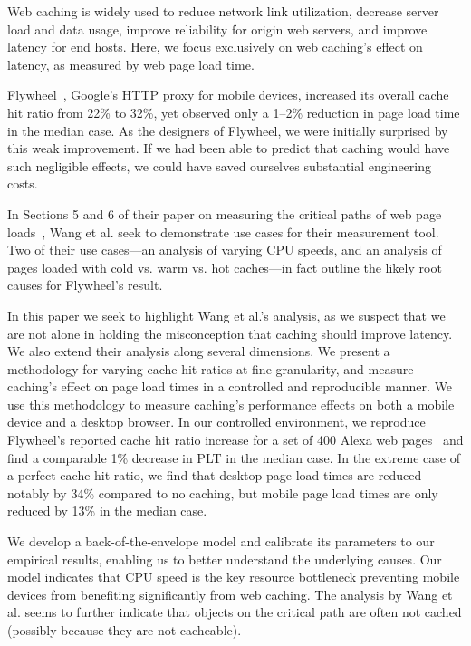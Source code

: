 \label{intro}
Web caching is widely used to reduce network link utilization, decrease server load and data usage, improve reliability for origin web servers, and improve latency for end hosts.
Here, we focus exclusively on web caching's effect on latency, as measured by web page load time.

Flywheel~\cite{flywheel}, Google's HTTP proxy for mobile devices, increased
its overall cache hit ratio from 22\% to 32\%, yet observed only a 1--2\% reduction in page load time in the median case.
As the designers of Flywheel, we were initially surprised by this weak
improvement. If we had been able to predict that caching would have such
negligible effects, we could have saved ourselves substantial engineering costs. %

In Sections 5 and 6 of their paper on measuring the critical paths of web page 
loads~\cite{wang2013demystifying}, Wang et al. seek to demonstrate use 
cases for their measurement tool. Two of their use cases---an analysis of
varying CPU speeds, and an analysis of pages loaded with cold vs. warm vs. hot caches---in fact outline the likely root causes for Flywheel's result.

In this paper we seek to highlight Wang et al.'s analysis, as we suspect that
we are not alone in holding the misconception that caching should
improve latency. We also extend
their analysis along several dimensions. We present 
a methodology for varying cache hit ratios at fine granularity,
and measure caching's effect on page load times in a controlled and 
reproducible manner.
We use this methodology to measure caching's performance effects on both a mobile device and a desktop browser.
In our controlled environment, we reproduce Flywheel's reported cache hit
ratio increase for
a set of
400 Alexa web pages~\cite{alexa} and find a comparable 1\% decrease in PLT in the median
case.
In the extreme case of a perfect cache hit ratio, we find that desktop page load times are reduced notably by 34\% compared to no caching, but mobile page load times are only reduced by 13\% in the median case.

We develop a back-of-the-envelope model and calibrate its parameters to
our empirical results, enabling us to better understand the underlying causes.
Our model indicates that CPU speed is the key resource bottleneck preventing mobile devices from benefiting significantly from web caching. 
The analysis by Wang et al. seems to further indicate that objects on the critical path are often not cached (possibly because they are not cacheable).

